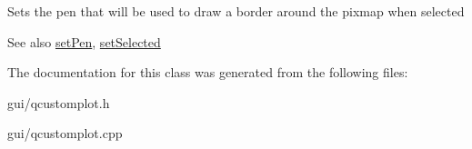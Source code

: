 Sets the pen that will be used to draw a border around the pixmap when selected

\begin{DoxySeeAlso}{See also}
\hyperlink{classQCPItemPixmap_acdade1305edb4b5cae14f97fd132065f}{set\+Pen}, \hyperlink{classQCPAbstractItem_a203de94ad586cc44d16c9565f49d3378}{set\+Selected} 
\end{DoxySeeAlso}


The documentation for this class was generated from the following files\+:\begin{DoxyCompactItemize}
\item 
gui/qcustomplot.\+h\item 
gui/qcustomplot.\+cpp\end{DoxyCompactItemize}
